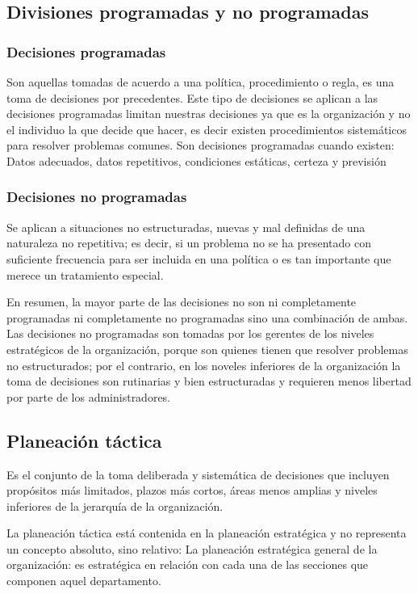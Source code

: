\subsection{Divisiones programadas y no programadas}
\subsubsection{Decisiones programadas}
Son aquellas tomadas de acuerdo a una política, procedimiento o regla, es una toma de decisiones por precedentes. Este tipo de decisiones se aplican a las decisiones programadas limitan nuestras decisiones ya que es la organización y no el individuo la que decide que hacer, es decir existen procedimientos sistemáticos para resolver problemas comunes. Son decisiones programadas cuando existen: Datos adecuados, datos repetitivos, condiciones estáticas, certeza y previsión
\subsubsection{Decisiones no programadas}
Se aplican a situaciones no estructuradas, nuevas y mal definidas de una naturaleza no repetitiva; es decir, si un problema no se ha presentado con suficiente frecuencia para ser incluida en una política o es tan importante que merece un tratamiento especial.

En resumen, la mayor parte de las decisiones no son ni completamente programadas ni completamente no programadas sino una combinación de ambas. Las decisiones no programadas son tomadas por los gerentes de los niveles estratégicos de la organización, porque son quienes tienen que resolver problemas no estructurados; por el contrario, en los noveles inferiores de la organización la toma de decisiones son rutinarias y bien estructuradas y requieren menos libertad por parte de los administradores.
\subsection{Planeación táctica}

Es el conjunto de la toma deliberada y sistemática de decisiones que incluyen propósitos más limitados, plazos más cortos, áreas menos amplias y niveles inferiores de la jerarquía de la organización.

La planeación táctica está contenida en la planeación estratégica y no representa un concepto absoluto, sino relativo: La planeación estratégica general de la organización: es estratégica en relación con cada una de las secciones que componen aquel departamento. 

